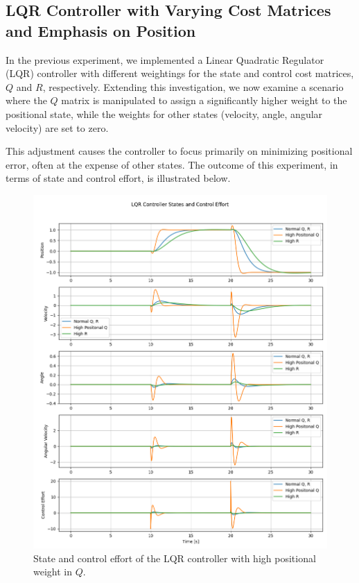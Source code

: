 \documentclass[11pt,twocolumn,twoside,lineno]{pnas-new}
\begin{document}
\subsection{LQR Controller with Varying Cost Matrices and Emphasis on Position}
In the previous experiment, we implemented a Linear Quadratic Regulator (LQR) controller with different weightings for the state and control cost matrices, $Q$ and $R$, respectively. Extending this investigation, we now examine a scenario where the $Q$ matrix is manipulated to assign a significantly higher weight to the positional state, while the weights for other states (velocity, angle, angular velocity) are set to zero. 

This adjustment causes the controller to focus primarily on minimizing positional error, often at the expense of other states. The outcome of this experiment, in terms of state and control effort, is illustrated below.

\begin{figure}[h]
\centering
\includegraphics[width=\linewidth]{simulations/lqr_controller_high_posiitonal_q.png}
\caption{State and control effort of the LQR controller with high positional weight in $Q$.}
\end{figure}
\end{document}
